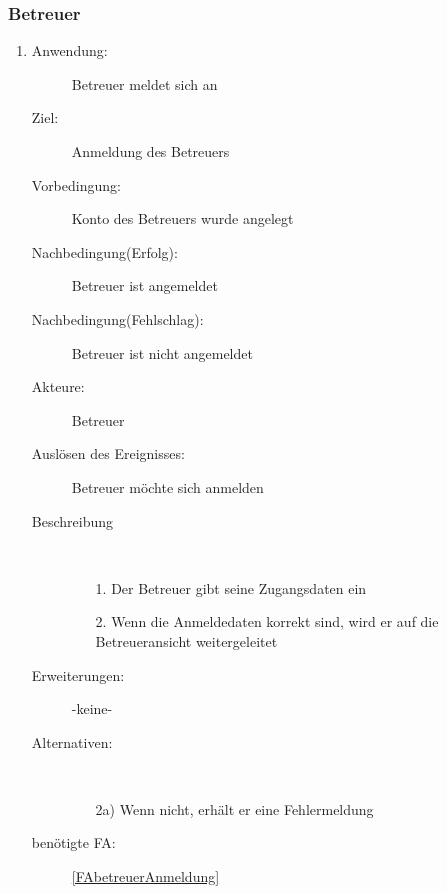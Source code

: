 \documentclass[parskip=full]{scrartcl}
\newcommand{\swtLabel}[1]{\textbf{/#1\arabic*0/}}
\begin{document}
\subsubsection{Betreuer}
\begin{enumerate} [label=\swtLabel{B}]
  \item \label{UCbetreuerAnmeldung}
	 \begin{description}
		\item[Anwendung:] Betreuer meldet sich an
  		\item[Ziel:] Anmeldung des Betreuers
  		\item[Vorbedingung:] Konto des Betreuers wurde angelegt
  		\item[Nachbedingung(Erfolg):] Betreuer ist angemeldet
  		\item[Nachbedingung(Fehlschlag):] Betreuer ist nicht angemeldet
  		\item[Akteure:] Betreuer
  		\item[Auslösen des Ereignisses:] Betreuer möchte sich anmelden
  		\item[Beschreibung]~
  		\begin{enumerate}
  			\item[1.] Der Betreuer gibt seine Zugangsdaten ein
  			\item[2.] Wenn die Anmeldedaten korrekt sind, wird er auf die
  			Betreueransicht weitergeleitet
  		\end{enumerate}
  		\item[Erweiterungen:] -keine-
  		\item[Alternativen:] ~
  		\begin{enumerate}
  		  \item[2a)] Wenn nicht, erhält er eine Fehlermeldung
  		\end{enumerate}  
  		\item[benötigte FA:] \ref{FAbetreuerAnmeldung}
  	\end{description}
   

\end{enumerate}
\end{document}

